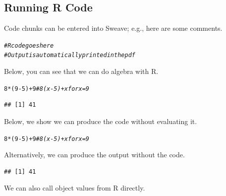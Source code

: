\documentclass{article}\usepackage[]{graphicx}\usepackage[]{xcolor}
\makeatletter
\newcommand{\hlnum}[1]{\textcolor[rgb]{0.686,0.059,0.569}{#1}}%
\newcommand{\hlcom}[1]{\textcolor[rgb]{0.678,0.584,0.686}{\textit{#1}}}%
\newcommand{\hlopt}[1]{\textcolor[rgb]{0,0,0}{#1}}%
\newcommand{\hldef}[1]{\textcolor[rgb]{0.345,0.345,0.345}{#1}}%
\newenvironment{kframe}{%
 \def\at@end@of@kframe{}%
 \ifinner\ifhmode%
  \def\at@end@of@kframe{\end{minipage}}%
  \begin{minipage}{\columnwidth}%
 \fi\fi%
 \def\FrameCommand##1{\hskip\@totalleftmargin \hskip-\fboxsep
 \colorbox{shadecolor}{##1}\hskip-\fboxsep
     \hskip-\linewidth \hskip-\@totalleftmargin \hskip\columnwidth}%
 \MakeFramed {\advance\hsize-\width
   \@totalleftmargin\z@ \linewidth\hsize
   \@setminipage}}%
 {\par\unskip\endMakeFramed%
 \at@end@of@kframe}
\newenvironment{knitrout}{}{} %
\makeatother
\begin{document}
\begin{multicols}{2}
\subsection{Running R Code}
Code chunks can be entered into Sweave; e.g., here are some comments.
\begin{knitrout}\scriptsize
{}\color{fgcolor}\begin{kframe}
\begin{alltt}
\hlcom{# R code goes here}
\hlcom{# Output is automatically printed in the pdf}
\end{alltt}
\end{kframe}
\end{knitrout}
Below, you can see that we can do algebra with R.
\begin{knitrout}\scriptsize
{}\color{fgcolor}\begin{kframe}
\begin{alltt}
\hlnum{8}\hlopt{*}\hldef{(}\hlnum{9}\hlopt{-}\hlnum{5}\hldef{)} \hlopt{+} \hlnum{9}    \hlcom{# 8(x-5) + x for x=9}
\end{alltt}
\begin{verbatim}
## [1] 41
\end{verbatim}
\end{kframe}
\end{knitrout}
Below, we show we can produce the code without evaluating it.
\begin{knitrout}\scriptsize
{}\color{fgcolor}\begin{kframe}
\begin{alltt}
\hlnum{8}\hlopt{*}\hldef{(}\hlnum{9}\hlopt{-}\hlnum{5}\hldef{)} \hlopt{+} \hlnum{9}  \hlcom{# 8(x-5) + x for x=9}
\end{alltt}
\end{kframe}
\end{knitrout}
Alternatively, we can produce the output without the code.
\begin{knitrout}\scriptsize
{}\color{fgcolor}\begin{kframe}
\begin{verbatim}
## [1] 41
\end{verbatim}
\end{kframe}
\end{knitrout}
We can also call object values from R directly.
\begin{knitrout}\scriptsize

\end{knitrout}
\end{multicols}
\end{document}
